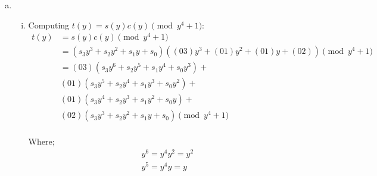 \documentclass[11pt]{article}
\theoremstyle{definition}
\begin{document}
\begin{enumerate}[a. ]
  \item
    \begin{enumerate}[i. ]
      \item Computing $t(y) = s(y)c(y) \pmod{y^4 + 1}$:
        \begin{align*}
          t(y) &= s(y)c(y) \pmod{y^4 + 1} \\
               &= (s_3y^3 + s_2y^2 + s_1y + s_0)((03)y^3 + (01)y^2 + (01)y + (02)) \pmod{y^4 + 1} \\
               &= (03)(s_3y^6 + s_2y^5 + s_1y^4 + s_0y^3) + \\
               &  (01)(s_3y^5 + s_2y^4 + s_1y^3 + s_0y^2) + \\
               &  (01)(s_3y^4 + s_2y^3 + s_1y^2 + s_0y  ) + \\
               &  (02)(s_3y^3 + s_2y^2 + s_1y   + s_0   ) \pmod{y^4 + 1} \\
        \end{align*}

        Where;
        \begin{align*}
          & y^6 = y^4y^2 = y^2 \\
          & y^5 = y^4y = y
        \end{align*}


\end{enumerate}
\end{enumerate}
\end{document}
